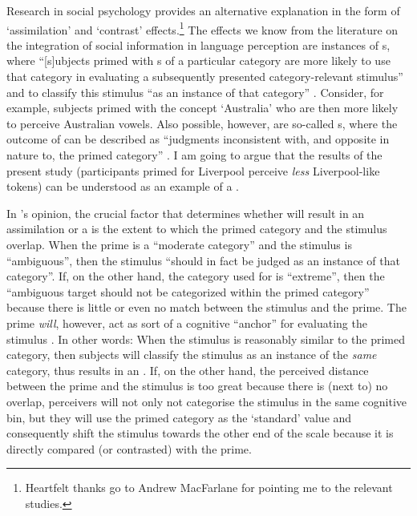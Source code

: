 Research in social psychology provides an alternative explanation in the form of `assimilation' and `contrast' effects.\footnote{Heartfelt thanks go to Andrew MacFarlane for pointing me to the relevant studies.}
The  effects we know from the literature on the integration of social information in language perception are instances of s, where ``[s]ubjects primed with s of a particular category are more likely to use that category in evaluating a subsequently presented category-relevant stimulus'' and to classify this stimulus ``as an instance of that category'' \parencite[1106--1107]{herr1986}.
Consider, for example, subjects primed with the concept `Australia' who are then more likely to perceive Australian vowels.
Also possible, however, are so-called s, where the outcome of  can be described as ``judgments inconsistent with, and opposite in nature to, the primed category'' \parencite[1107]{herr1986}.
I am going to argue that the results of the present study (participants primed for Liverpool perceive \emph{less} Liverpool-like tokens) can be understood as an example of a .

In \citeauthor{herr1986}'s opinion, the crucial factor that determines whether  will result in an assimilation or a  is the extent to which the primed category and the stimulus overlap.
When the prime is a ``moderate category'' and the stimulus is ``ambiguous'', then the stimulus ``should in fact be judged as an instance of that category''.
If, on the other hand, the category used for  is ``extreme'', then the ``ambiguous target should not be categorized within the primed category'' because there is little or even no match between the stimulus and the prime.
The prime \emph{will}, however, act as sort of a cognitive ``anchor'' for evaluating the stimulus \parencite[cf.][1107]{herr1986}.
In other words: When the stimulus is reasonably similar to the primed category, then subjects will classify the stimulus as an instance of the \emph{same} category,  thus results in an .
If, on the other hand, the perceived distance between the prime and the stimulus is too great because there is (next to) no overlap, perceivers will not only not categorise the stimulus in the same cognitive bin, but they will use the primed category as the `standard' value and consequently shift the stimulus towards the other end of the scale because it is directly compared (or contrasted) with the prime.

